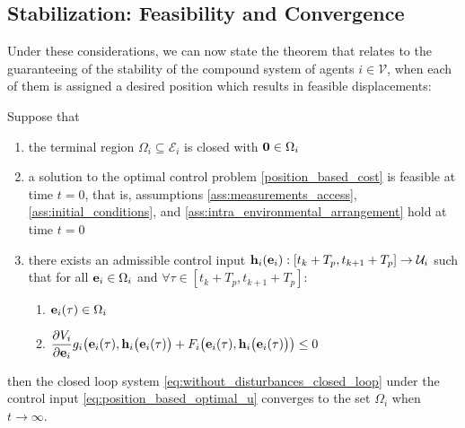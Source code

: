\subsection{Stabilization: Feasibility and Convergence}

Under these considerations, we can now state the theorem that relates to
the guaranteeing of the stability of the compound system of agents
$i \in \mathcal{V}$, when each of them is assigned a desired
position which results in feasible displacements:\\

\begin{bw_box}
\begin{theorem}

  Suppose that

  \begin{enumerate}
    \item the terminal region $\Omega_i \subseteq \mathcal{E}_i$ is
      closed with $\bm{\mathbf{0}} \in \Omega_i$
    \item a solution to the optimal control problem \eqref{position_based_cost}
      is feasible at time $t=0$, that is, assumptions
      \eqref{ass:measurements_access}, \eqref{ass:initial_conditions}, and
      \eqref{ass:intra_environmental_arrangement} hold at time $t=0$
    \item there exists an admissible control input
      $\bm{\mathbf{h}}_i(\bm{\mathbf{e}}_i) : [t_k + T_p, t_{k+1} + T_p] \to \mathcal{U}_i$
      such that for all $\bm{\mathbf{e}}_i \in \Omega_i$ and
      $\forall \tau \in [t_k + T_p, t_{k+1} + T_p]$:

      \begin{enumerate}
        \item $\bm{\mathbf{e}}_i(\tau) \in \Omega_i$
        \item $\dfrac{\partial V_i}{\partial \bm{\mathbf{e}}_i} g_i\big(\bm{\mathbf{e}}_i(\tau),
        \bm{\mathbf{h}}_i\big(\bm{\mathbf{e}}_i(\tau)\big)
          + F_i\big(\bm{\mathbf{e}}_i(\tau), \bm{\mathbf{h}}_i\big(\bm{\mathbf{e}}_i(\tau)\big)\big) \leq 0$
      \end{enumerate}

  \end{enumerate}

  then the closed loop system \eqref{eq:without_disturbances_closed_loop} under
  the control input \eqref{eq:position_based_optimal_u} converges to the set
  $\Omega_i$ when $t \to \infty$.

\end{theorem}
\end{bw_box}

